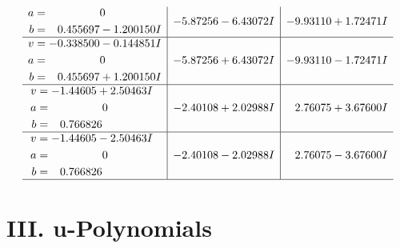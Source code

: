 \documentclass[1p]{elsarticle_modified}
\theoremstyle{definition}
\begin{document}
$$\begin{array}{c|c|c}
\begin{aligned}
a &= \phantom{-0.000000 } 0 \\
b &= \phantom{-}0.455697 - 1.200150 I\end{aligned}
 & -5.87256 - 6.43072 I & -9.93110 + 1.72471 I \\ \hline\begin{aligned}
v &= -0.338500 - 0.144851 I \\
a &= \phantom{-0.000000 } 0 \\
b &= \phantom{-}0.455697 + 1.200150 I\end{aligned}
 & -5.87256 + 6.43072 I & -9.93110 - 1.72471 I \\ \hline\begin{aligned}
v &= -1.44605 + 2.50463 I \\
a &= \phantom{-0.000000 } 0 \\
b &= \phantom{-}0.766826\phantom{ +0.000000I}\end{aligned}
 & -2.40108 + 2.02988 I & \phantom{-}2.76075 + 3.67600 I \\ \hline\begin{aligned}
v &= -1.44605 - 2.50463 I \\
a &= \phantom{-0.000000 } 0 \\
b &= \phantom{-}0.766826\phantom{ +0.000000I}\end{aligned}
 & -2.40108 - 2.02988 I & \phantom{-}2.76075 - 3.67600 I\\
 \hline 
 \end{array}$$\newpage
\newpage\renewcommand{\arraystretch}{1}
\centering \section*{ III. u-Polynomials}
\end{document}
